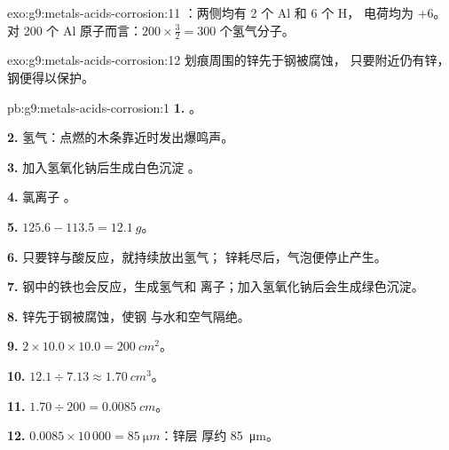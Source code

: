 \begin{solution}{exo:g9:metals-acids-corrosion:11}
：两侧均有 2 个 Al 和 6 个 H，
电荷均为 $+6$。对 200 个 Al 原子而言：$200 \times \frac{3}{2} = 300$
个氢气分子。
\end{solution}

\begin{solution}{exo:g9:metals-acids-corrosion:12}
划痕周围的锌先于钢被腐蚀，
只要附近仍有锌，钢便得以保护。
\end{solution}

\begin{solution}{pb:g9:metals-acids-corrosion:1}
\textbf{1.} 。

\textbf{2.} 氢气：点燃的木条靠近时发出爆鸣声。

\textbf{3.} 加入氢氧化钠后生成白色沉淀
。

\textbf{4.} 氯离子 。

\textbf{5.} $125.6 - 113.5 = \qty{12.1}{g}$。

\textbf{6.} 只要锌与酸反应，就持续放出氢气；
锌耗尽后，气泡便停止产生。

\textbf{7.} 钢中的铁也会反应，生成氢气和
 离子；加入氢氧化钠后会生成绿色沉淀。

\textbf{8.} 锌先于钢被腐蚀，使钢
与水和空气隔绝。

\textbf{9.} $2 \times 10.0 \times 10.0 = \qty{200}{cm^2}$。

\textbf{10.} $12.1 \div 7.13 \approx \qty{1.70}{cm^3}$。

\textbf{11.} $1.70 \div 200 = \qty{0.0085}{cm}$。

\textbf{12.} $0.0085 \times 10\,000 = \qty{85}{\micro m}$：锌层
厚约 \qty{85}{\micro m}。
\end{solution}
